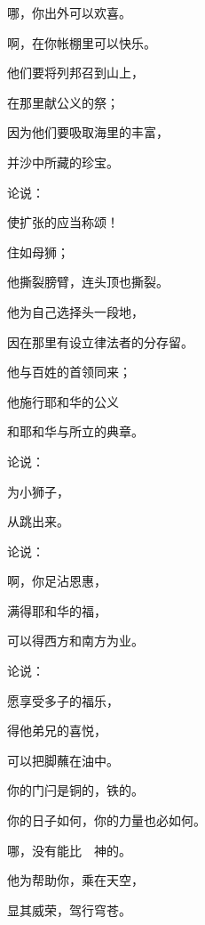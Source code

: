 {\par }{哪，你出外可以欢喜。
\par }{啊，在你帐棚里可以快乐。
\par }{\Q {}他们要将列邦召到山上，
\par }{\Q 在那里献公义的祭；
\par }{\Q 因为他们要吸取海里的丰富，
\par }{\Q 并沙中所藏的珍宝。
\par }{\BB \par }{\Q {}论{}说：
\par }{\Q 使{}扩张的应当称颂！
\par }{住如母狮；
\par }{\Q 他撕裂膀臂，连头顶也撕裂。
\par }{\Q {}他为自己选择头一段地，
\par }{\Q 因在那里有设立律法者的分存留。
\par }{\Q 他与百姓的首领同来；
\par }{\Q 他施行耶和华的公义
\par }{\Q 和耶和华与{}所立的典章。
\par }{\BB \par }{\Q {}论{}说：
\par }{为小狮子，
\par }{\Q 从{}跳出来。
\par }{\BB \par }{\Q {}论{}说：
\par }{啊，你足沾恩惠，
\par }{\Q 满得耶和华的福，
\par }{\Q 可以得西方和南方为业。
\par }{\BB \par }{\Q {}论{}说：
\par }{\Q 愿{}享受多子的福乐，
\par }{\Q 得他弟兄的喜悦，
\par }{\Q 可以把脚蘸在油中。
\par }{\Q {}你的门闩是铜的，铁的。
\par }{\Q 你的日子如何，你的力量也必如何。
\par }{\BB \par }{\Q {}哪，没有能比　神的。
\par }{\Q 他为帮助你，乘在天空，
\par }{\Q 显其威荣，驾行穹苍。
}
